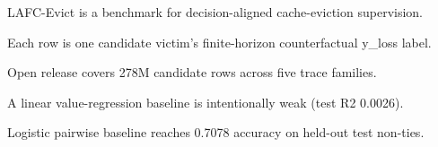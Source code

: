 %
%
%
\begin{highlights}
\item LAFC-Evict is a benchmark for decision-aligned cache-eviction supervision.
\item Each row is one candidate victim's finite-horizon counterfactual y\_loss label.
\item Open release covers 278M candidate rows across five trace families.
\item A linear value-regression baseline is intentionally weak (test R2 0.0026).
\item Logistic pairwise baseline reaches 0.7078 accuracy on held-out test non-ties.
\end{highlights}

